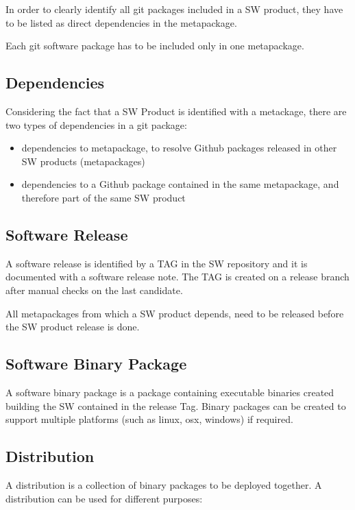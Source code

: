 In order to clearly identify all git packages included in a SW product, they have to be listed as direct dependencies in the metapackage.

Each git software package has to be included only in one metapackage.

\subsection{Dependencies} \label{sect:dependencies}

Considering the fact that a SW Product is identified with a metackage, there are two types of dependencies in a git package:

\begin{itemize}
\item dependencies to metapackage, to resolve Github packages released in other SW products (metapackages)
\item dependencies to a Github package contained in the same metapackage, and therefore part of the same SW product
\end{itemize}

\subsection{Software Release} \label{sect:swrel}
A software release is identified by a TAG in the SW repository and it is documented with a software release note.
The TAG is created on a release branch after manual checks on the last candidate.

All metapackages from which a SW product depends, need to be released before the SW product release is done.


\subsection{Software Binary Package} \label{sect:swbpkg}
A software binary package is a package containing executable binaries created building the SW contained in the release Tag. 
Binary packages can be created to support multiple platforms (such as linux, osx, windows) if required.


\subsection{Distribution} \label{sect:distribution}
A distribution is a collection of binary packages to be deployed together.
A distribution can be used for different purposes:

